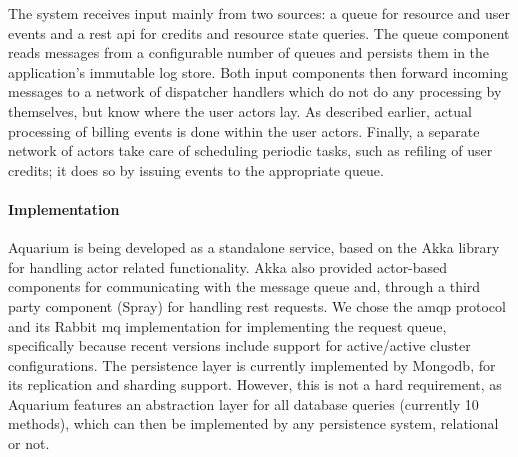 The system receives input mainly from two sources: a queue for
resource and user events and a {\sc rest api} for credits and resource
state queries. The queue component reads messages from a configurable
number of queues and persists them in the application's immutable log
store. Both input components then forward incoming messages to a
network of dispatcher handlers which do not do any processing by
themselves, but know where the user actors lay. As described earlier,
actual processing of billing events is done within the user actors.
Finally, a separate network of actors take care of scheduling periodic
tasks, such as refiling of user credits; it does so by issuing events
to the appropriate queue.

\paragraph{Implementation}

Aquarium is being developed as a standalone service, based on the Akka
library for handling actor related functionality. Akka also provided
actor-based components for communicating with the message queue and,
through a third party component
(Spray) for handling {\sc
  rest} requests. We chose the {\sc amqp} protocol and its Rabbit{\sc
  mq} implementation for implementing the request queue, specifically
because recent versions include support for active/active cluster
configurations. The persistence layer is currently implemented by
Mongo{\sc db}, for its replication and sharding support. However, this
is not a hard requirement, as Aquarium features an abstraction layer
for all database queries (currently 10 methods), which can then be
implemented by any persistence system, relational or not.

